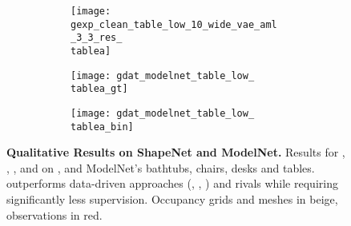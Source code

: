 \begin{figure*}[t]
{\begin{subfigure}[t]{1\textwidth}
\begin{subfigure}[t]{0.095\textwidth}
   			\texttt{[image: gexp\_clean\_table\_low\_10\_wide\_vae\_aml\_3\_3\_res\_\\tablea]}
   		\end{subfigure}
   		\begin{subfigure}[t]{0.095\textwidth}
   			\vspace{0px}\centering
   			\texttt{[image: gdat\_modelnet\_table\_low\_\\tablea\_gt]}
   		\end{subfigure}
   		\begin{subfigure}[t]{0.095\textwidth}
   			\vspace{0px}\centering
   			\texttt{[image: gdat\_modelnet\_table\_low\_\\tablea\_bin]}
   		\end{subfigure}
   	\end{subfigure}
    }
    \vspace*{-\figskipcaption px}
    \caption{{\bf Qualitative Results on ShapeNet and ModelNet.} Results for \AML, \Dai, \Engelmann, \ICP and \ML on \clean, \noisy and ModelNet's bathtubs, chairs, desks and tables. \AML outperforms data-driven approaches (\ML, \Engelmann, \ICP) and rivals \Dai while requiring significantly less supervision. Occupancy grids and meshes in {\color{rbeige}beige}, observations in {\color{rred}red}.}
    \label{fig:results-synthetic}
    \vspace*{-\figskipbelow px}
\end{figure*}